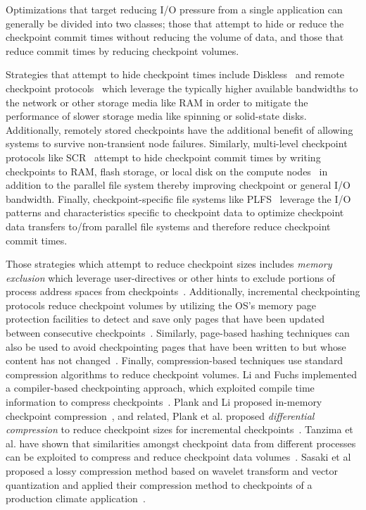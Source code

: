 Optimizations that target reducing I/O pressure from a single application can
generally be divided into two classes; those that attempt to hide or reduce the
checkpoint commit times without reducing the volume of data, and those that
reduce commit times by reducing checkpoint volumes. 

Strategies that attempt to hide checkpoint times include
Diskless~\cite{Plank98Diskless} and remote checkpoint
protocols~\cite{Cornwell11RemoteBLCR,Stellner96CoCheck,Zandy99ProcessHijacking}
which leverage the typically higher available bandwidths to the network or
other storage media like RAM in order to mitigate the performance of slower
storage media like spinning or solid-state disks. Additionally, remotely stored
checkpoints have the additional benefit of allowing systems to survive
non-transient node failures. Similarly, multi-level checkpoint protocols like
SCR~\cite{Moody10SCR,Vaidya95TwoLevel} attempt to hide checkpoint commit times
by writing checkpoints to RAM, flash storage, or local disk on the compute
nodes~\cite{Kougkas2016} in addition to the parallel file system thereby
improving checkpoint or general I/O bandwidth.  Finally, checkpoint-specific
file systems like PLFS~\cite{Bent09PLFS} leverage the I/O patterns and
characteristics specific to checkpoint data to optimize checkpoint data
transfers to/from parallel file systems and therefore reduce checkpoint commit
times.

Those strategies which attempt to reduce checkpoint sizes includes \emph{memory
exclusion} which leverage user-directives or other hints to exclude portions of
process address spaces from checkpoints~\cite{Plank99MemoryExclusion}.
Additionally, incremental checkpointing protocols reduce checkpoint volumes by
utilizing the OS's memory page protection facilities to detect and save only
pages that have been updated between consecutive
checkpoints~\cite{Bronevetsky09Compiler,
Chen97CLIP,Elnozahy92ConsistentCheckpointing,Li94ConcurrentCheckpointing,
Plank94Libckpt,Paun10IncrementalWeibull,Kiswany08stdchk}.  Similarly, page-based
hashing techniques can also be used to avoid checkpointing pages that have been
written to but whose content has not changed~\cite{Ferreira11Libhashckpt}.
Finally, compression-based techniques use standard compression algorithms to
reduce checkpoint volumes.  Li and Fuchs implemented a compiler-based
checkpointing approach, which exploited compile time information to compress
checkpoints~\cite{Li90CATCH}.  Plank and Li proposed in-memory checkpoint
compression~\cite{Plank94ICKP}, and related, Plank et al. proposed
\textit{differential compression} to reduce checkpoint sizes for incremental
checkpoints~\cite{Plank95CompressedDiff}.  Tanzima et al. have shown that
similarities amongst checkpoint data from different processes can be exploited
to compress and reduce checkpoint data volumes~\cite{tanzima12mcrengine}.
Sasaki   et   al  proposed   a   lossy
compression method based on wavelet transform
and  vector  quantization and   applied  their  compression
method  to   checkpoints of a   production   climate  application~\cite{sasaki2015}.

